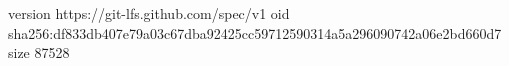 version https://git-lfs.github.com/spec/v1
oid sha256:df833db407e79a03c67dba92425cc59712590314a5a296090742a06e2bd660d7
size 87528
